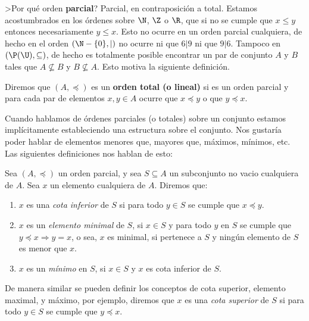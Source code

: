 
>Por qué orden {\bf parcial}?
Parcial, en contraposición a total.
Estamos acostumbrados en los órdenes sobre $\N$, $\Z$ o $\R$, que si no se cumple que $x\leq y$ entonces necesariamente $y\leq x$.
Esto no ocurre en un orden parcial cualquiera, de hecho en el orden $(\N-\{0\},|)$ no ocurre ni que $6|9$ ni que $9|6$.
Tampoco en $(\P(\U),\subseteq)$, de hecho es totalmente posible encontrar un par de conjunto $A$ y $B$ tales que $A\not\subseteq B$ y $B\not\subseteq A$.
Esto motiva la siguiente definición.

\begin{definicion}
Diremos que $(A,\preceq)$ es un {\bf orden total (o lineal)} si es un orden parcial y para cada par de elementos $x,y\in A$ ocurre que $x\preceq y$ o que $y\preceq x$.
\end{definicion}

Cuando hablamos de órdenes parciales (o totales) sobre un conjunto estamos implícitamente estableciendo una estructura sobre el conjunto.
Nos gustaría poder hablar de elementos menores que, mayores que, máximos, mínimos, etc.
Las siguientes definiciones nos hablan de esto:

\begin{definicion}
Sea $(A,\preceq)$ un orden parcial, y sea $S\subseteq A$ un subconjunto no vacio cualquiera de $A$.
Sea $x$ un elemento cualquiera de $A$.
Diremos que:
\begin{enumerate}
	\itemsep 0pt
  \item $x$ es una \emph{cota inferior} de $S$ si para todo $y\in S$ se cumple que $x\preceq y$.
  \item $x$ es un \emph{elemento minimal} de $S$, si $x\in S$ y para todo $y$ en $S$ se cumple que $y\preceq x\Rightarrow y=x$, o sea, $x$ es minimal, si pertenece a $S$ y ningún elemento de $S$ es menor que $x$.
  \item $x$ es un \emph{mínimo} en $S$, si $x\in S$ y $x$ es cota inferior de $S$.
\end{enumerate}
De manera similar se pueden definir los conceptos de cota superior, elemento maximal, y máximo, por ejemplo, diremos que $x$ es una \emph{cota superior} de $S$ si para todo $y\in S$ se cumple que $y\preceq x$.
\end{definicion}

